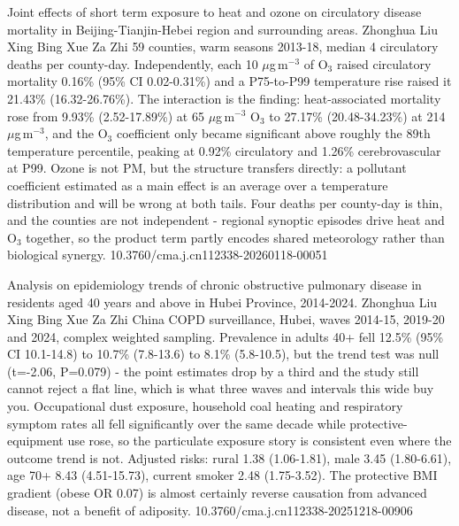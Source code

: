 \documentclass[10pt]{article}
\begin{document}
{Joint effects of short term exposure to heat and ozone on circulatory disease mortality in Beijing-Tianjin-Hebei region and surrounding areas.}
{Zhonghua Liu Xing Bing Xue Za Zhi}
{59 counties, warm seasons 2013-18, median 4 circulatory deaths per county-day. Independently, each 10 $\mu$g\,m$^{-3}$ of O$_3$ raised circulatory mortality 0.16\% (95\% CI 0.02-0.31\%) and a P75-to-P99 temperature rise raised it 21.43\% (16.32-26.76\%). The interaction is the finding: heat-associated mortality rose from 9.93\% (2.52-17.89\%) at 65 $\mu$g\,m$^{-3}$ O$_3$ to 27.17\% (20.48-34.23\%) at 214 $\mu$g\,m$^{-3}$, and the O$_3$ coefficient only became significant above roughly the 89th temperature percentile, peaking at 0.92\% circulatory and 1.26\% cerebrovascular at P99. Ozone is not PM, but the structure transfers directly: a pollutant coefficient estimated as a main effect is an average over a temperature distribution and will be wrong at both tails. Four deaths per county-day is thin, and the counties are not independent - regional synoptic episodes drive heat and O$_3$ together, so the product term partly encodes shared meteorology rather than biological synergy.}
{10.3760/cma.j.cn112338-20260118-00051}


{Analysis on epidemiology trends of chronic obstructive pulmonary disease in residents aged 40 years and above in Hubei Province, 2014-2024.}
{Zhonghua Liu Xing Bing Xue Za Zhi}
{China COPD surveillance, Hubei, waves 2014-15, 2019-20 and 2024, complex weighted sampling. Prevalence in adults 40+ fell 12.5\% (95\% CI 10.1-14.8) to 10.7\% (7.8-13.6) to 8.1\% (5.8-10.5), but the trend test was null (t=-2.06, P=0.079) - the point estimates drop by a third and the study still cannot reject a flat line, which is what three waves and intervals this wide buy you. Occupational dust exposure, household coal heating and respiratory symptom rates all fell significantly over the same decade while protective-equipment use rose, so the particulate exposure story is consistent even where the outcome trend is not. Adjusted risks: rural 1.38 (1.06-1.81), male 3.45 (1.80-6.61), age 70+ 8.43 (4.51-15.73), current smoker 2.48 (1.75-3.52). The protective BMI gradient (obese OR 0.07) is almost certainly reverse causation from advanced disease, not a benefit of adiposity.}
{10.3760/cma.j.cn112338-20251218-00906}

\end{document}
